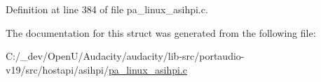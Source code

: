 Definition at line 384 of file pa\+\_\+linux\+\_\+asihpi.\+c.



The documentation for this struct was generated from the following file\+:\begin{DoxyCompactItemize}
\item 
C\+:/\+\_\+dev/\+Open\+U/\+Audacity/audacity/lib-\/src/portaudio-\/v19/src/hostapi/asihpi/\hyperlink{pa__linux__asihpi_8c}{pa\+\_\+linux\+\_\+asihpi.\+c}\end{DoxyCompactItemize}
